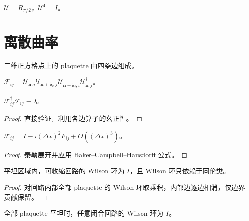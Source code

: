 \begin{example}\label{ex:lattice_c4}
$\mathcal{U}=R_{\pi/2}$，$\mathcal{U}^4=I$。
\end{example}

\section{离散曲率}\label{sec:discrete_curvature}

\begin{definition}[格点上的最小闭合回路]\label{def:plaquette}
二维正方格点上的 plaquette 由四条边组成。
\end{definition}

\begin{definition}\label{def:discrete_curvature}
$\mathcal{F}_{ij}=\mathcal{U}_{\mathbf{n},i}\mathcal{U}_{\mathbf{n}+\hat{\mathbf{e}}_i,j}\mathcal{U}_{\mathbf{n}+\hat{\mathbf{e}}_j,i}^\dagger\mathcal{U}_{\mathbf{n},j}^\dagger$。
\end{definition}

\begin{proposition}[离散曲率的幺正性]\label{prop:wilson_unitary}
$\mathcal{F}_{ij}^\dagger\mathcal{F}_{ij}=I$。
\end{proposition}

\begin{proof}
直接验证，利用各边算子的幺正性。
\end{proof}

\begin{proposition}[离散曲率与连续曲率的关系]\label{prop:discrete_continuous_curvature}
$\mathcal{F}_{ij}=I-i(\Delta x)^2F_{ij}+O((\Delta x)^3)$。
\end{proposition}

\begin{proof}
泰勒展开并应用 Baker–Campbell–Hausdorff 公式。
\end{proof}

\begin{lemma}\label{ch12_wilson_homotopy_lemma}
平坦区域内，可收缩回路的 Wilson 环为 $I$，且 Wilson 环只依赖于同伦类。
\end{lemma}

\begin{proof}
对回路内部全部 plaquette 的 Wilson 环取乘积，内部边逐边相消，仅边界贡献保留。
\end{proof}

\begin{corollary}[平坦连接的全局相位锁定]\label{ch12_wilson_flat_corollary}
全部 plaquette 平坦时，任意闭合回路的 Wilson 环为 $I$。
\end{corollary}


